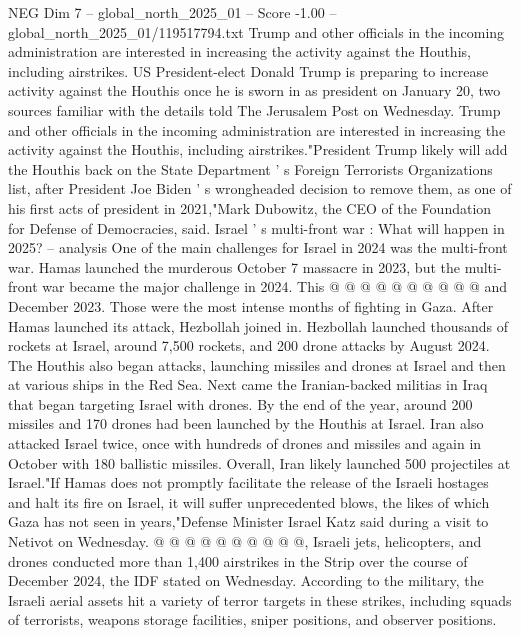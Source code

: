 \begin{textsample}{NEG Dim 7 – global\_north\_2025\_01 – Score -1.00 – global\_north\_2025\_01/119517794.txt}  \label{ex:f7_neg_186}
Trump and other officials in the incoming administration are interested in increasing the activity against the Houthis, including airstrikes.
US President-elect Donald Trump is preparing to increase activity against the Houthis once he is sworn in as president on January 20, two sources familiar with the details told The Jerusalem Post on Wednesday.
Trump and other officials in the incoming administration are interested in increasing the activity against the Houthis, including airstrikes."President Trump likely will add the Houthis back on the State Department ' s Foreign Terrorists Organizations list, after President Joe Biden ' s wrongheaded decision to remove them, as one of his first acts of president in 2021,"Mark Dubowitz, the CEO of the Foundation for Defense of Democracies, said.
Israel ' s multi-front war : What will happen in 2025? -- analysis One of the main challenges for Israel in 2024 was the multi-front war.
Hamas launched the murderous October 7 massacre in 2023, but the multi-front war became the major challenge in 2024.
This @ @ @ @ @ @ @ @ @ @ and December 2023.
Those were the most intense months of fighting in Gaza.
After Hamas launched its attack, Hezbollah joined in.
Hezbollah launched thousands of rockets at Israel, around 7,500 rockets, and 200 drone attacks by August 2024.
The Houthis also began attacks, launching missiles and drones at Israel and then at various ships in the Red Sea.
Next came the Iranian-backed militias in Iraq that began targeting Israel with drones.
By the end of the year, around 200 missiles and 170 drones had been launched by the Houthis at Israel.
Iran also attacked Israel twice, once with hundreds of drones and missiles and again in October with 180 ballistic missiles.
Overall, Iran likely launched 500 projectiles at Israel."If Hamas does not promptly facilitate the release of the Israeli hostages and halt its fire on Israel, it will suffer unprecedented blows, the likes of which Gaza has not seen in years,"Defense Minister Israel Katz said during a visit to Netivot on Wednesday. @ @ @ @ @ @ @ @ @ @, Israeli jets, helicopters, and drones conducted more than 1,400 airstrikes in the Strip over the course of December 2024, the IDF stated on Wednesday.
According to the military, the Israeli aerial assets hit a variety of terror targets in these strikes, including squads of terrorists, weapons storage facilities, sniper positions, and observer positions.

\end{textsample}
